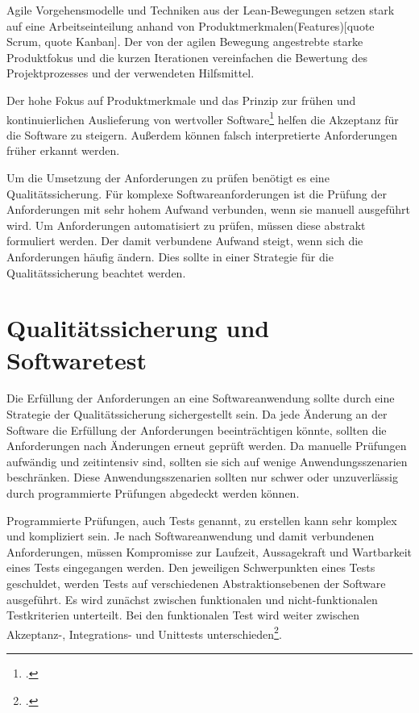 Agile Vorgehensmodelle und Techniken aus der Lean-Bewegungen setzen stark auf eine Arbeitseinteilung anhand von Produktmerkmalen(Features)[quote Scrum, quote Kanban]. Der von der agilen Bewegung angestrebte starke Produktfokus und die kurzen Iterationen vereinfachen die Bewertung des Projektprozesses und der verwendeten Hilfsmittel.

Der hohe Fokus auf Produktmerkmale und das Prinzip zur frühen und kontinuierlichen Auslieferung von wertvoller Software\footcite{agile-manifest-principles} helfen die Akzeptanz für die Software zu steigern. Außerdem können falsch interpretierte Anforderungen früher erkannt werden. 

Um die Umsetzung der Anforderungen zu prüfen benötigt es eine Qualitätssicherung. Für komplexe Softwareanforderungen ist die Prüfung der Anforderungen mit sehr hohem Aufwand verbunden, wenn sie manuell ausgeführt wird. Um Anforderungen automatisiert zu prüfen, müssen diese abstrakt formuliert werden. Der damit verbundene Aufwand steigt, wenn sich die Anforderungen häufig ändern. Dies sollte in einer Strategie für die Qualitätssicherung beachtet werden. 

\section{Qualitätssicherung und Softwaretest}

Die Erfüllung der Anforderungen an eine Softwareanwendung sollte durch eine Strategie der Qualitätssicherung sichergestellt sein. Da jede Änderung an der Software die Erfüllung der Anforderungen beeinträchtigen könnte, sollten die Anforderungen nach Änderungen erneut geprüft werden. Da manuelle Prüfungen aufwändig und zeitintensiv sind, sollten sie sich auf wenige Anwendungsszenarien beschränken. Diese Anwendungsszenarien sollten nur schwer oder unzuverlässig durch programmierte Prüfungen abgedeckt werden können.

Programmierte Prüfungen, auch Tests genannt, zu erstellen kann sehr komplex und kompliziert sein. Je nach Softwareanwendung und damit verbundenen Anforderungen, müssen Kompromisse zur Laufzeit, Aussagekraft und Wartbarkeit eines Tests eingegangen werden.
Den jeweiligen Schwerpunkten eines Tests geschuldet, werden Tests auf verschiedenen Abstraktionsebenen der Software ausgeführt. Es wird zunächst zwischen funktionalen und nicht-funktionalen Testkriterien unterteilt.
Bei den funktionalen Test wird weiter zwischen Akzeptanz-, Integrations- und Unittests unterschieden\footcite[S.159][]{software-quality2008}. 

